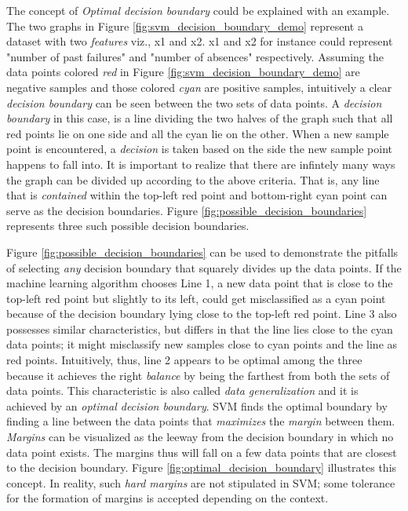 \documentclass{article}
\begin{document}
	The concept of \emph{Optimal decision boundary} could be explained with an example. The two graphs in Figure \ref{fig:svm_decision_boundary_demo} represent a dataset with two \emph{features} viz., x1 and x2. x1 and x2 for instance could represent "number of past failures" and "number of absences" respectively. Assuming the data points colored \emph{red} in Figure \ref{fig:svm_decision_boundary_demo} are negative samples and those colored \emph{cyan} are positive samples, intuitively a clear \emph{decision boundary} can be seen between the two sets of data points. A \emph{decision boundary} in this case, is a line dividing the two halves of the graph such that all red points lie on one side and all the cyan lie on the other. When a new sample point is encountered, a \emph{decision} is taken based on the side the new sample point happens to fall into. It is important to realize that there are infintely many ways the graph can be divided up according to the above criteria. That is, any line that is \emph{contained} within the top-left red point and bottom-right cyan point can serve as the decision boundaries. Figure \ref{fig:possible_decision_boundaries} represents three such possible decision boundaries. 
	
	Figure \ref{fig:possible_decision_boundaries} can be used to demonstrate the pitfalls of selecting \emph{any} decision boundary that squarely divides up the data points. If the machine learning algorithm chooses Line 1, a new data point that is close to the top-left red point but slightly to its left, could get misclassified as a cyan point because of the decision boundary lying close to the top-left red point. Line 3 also possesses similar characteristics, but differs in that the line lies close to the cyan data points; it might misclassify new samples close to cyan points and the line as red points. Intuitively, thus, line 2 appears to be optimal among the three because it achieves the right \emph{balance} by being the farthest from both the sets of data points. This characteristic is also called \emph{data generalization} and it is achieved by an \emph{optimal decision boundary}. SVM finds the optimal boundary by finding a line between the data points that \emph{maximizes} the \emph{margin} between them. \emph{Margins} can be visualized as the leeway from the decision boundary in which no data point exists. The margins thus will fall on a few data points that are closest to the decision boundary. Figure \ref{fig:optimal_decision_boundary} illustrates this concept. In reality, such \emph{hard margins} are not stipulated in SVM; some tolerance for the formation of margins is accepted depending on the context.
	
\end{document}
